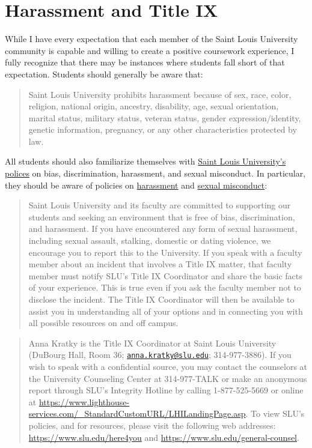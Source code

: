 \documentclass[
]{book}
\begin{document}
\hypertarget{harassment-and-title-ix}{%
\section{Harassment and Title IX}\label{harassment-and-title-ix}}

While I have every expectation that each member of the Saint Louis University community is capable and willing to create a positive coursework experience, I fully recognize that there may be instances where students fall short of that expectation. Students should generally be aware that:

\begin{quote}
Saint Louis University prohibits harassment because of sex, race, color, religion, national origin, ancestry, disability, age, sexual orientation, marital status, military status, veteran status, gender expression/identity, genetic information, pregnancy, or any other characteristics protected by law.
\end{quote}

All students should also familiarize themselves with \href{http://www.slu.edu/general-counsel/institutional-equity-diversity/}{Saint Louis University's polices} on bias, discrimination, harassment, and sexual misconduct. In particular, they should be aware of policies on \href{http://www.slu.edu/general-counsel/institutional-equity-diversity/harassment.php}{harassment} and \href{https://www.slu.edu/about/safety/sexual-assault-resources.php}{sexual misconduct}:

\begin{quote}
Saint Louis University and its faculty are committed to supporting our students and seeking an environment that is free of bias, discrimination, and harassment. If you have encountered any form of sexual harassment, including sexual assault, stalking, domestic or dating violence, we encourage you to report this to the University. If you speak with a faculty member about an incident that involves a Title IX matter, that faculty member must notify SLU's Title IX Coordinator and share the basic facts of your experience. This is true even if you ask the faculty member not to disclose the incident. The Title IX Coordinator will then be available to assist you in understanding all of your options and in connecting you with all possible resources on and off campus.
\end{quote}

\begin{quote}
Anna Kratky is the Title IX Coordinator at Saint Louis University (DuBourg Hall, Room 36; \href{mailto:anna.kratky@slu.edu}{\nolinkurl{anna.kratky@slu.edu}}; 314-977-3886). If you wish to speak with a confidential source, you may contact the counselors at the University Counseling Center at 314-977-TALK or make an anonymous report through SLU's Integrity Hotline by calling 1-877-525-5669 or online at \url{https://www.lighthouse-services.com/_StandardCustomURL/LHILandingPage.asp}. To view SLU's policies, and for resources, please visit the following web addresses: \url{https://www.slu.edu/here4you} and \url{https://www.slu.edu/general-counsel}.
\end{quote}
\end{document}
